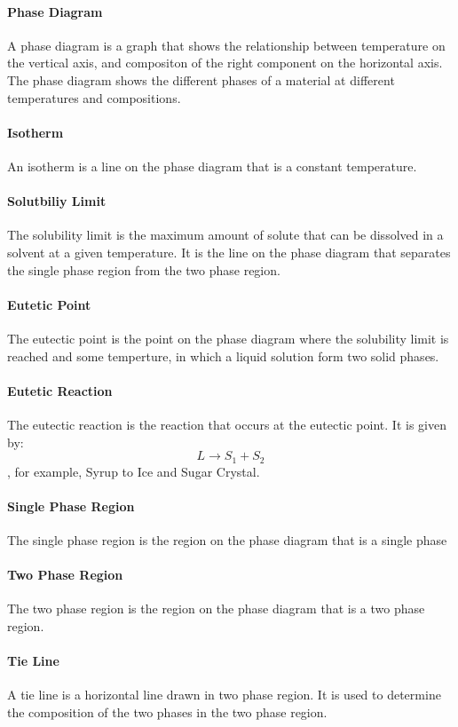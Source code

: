\documentclass[11pt]{article}
\begin{document}
\begin{Gibb's Energy}
\paragraph{Phase Diagram} A phase diagram is a graph that shows the relationship between temperature on the vertical axis, and compositon of the right component on the horizontal axis. The phase diagram shows the different phases of a material at different temperatures and compositions. 
\paragraph{Isotherm} An isotherm is a line on the phase diagram that is a constant temperature. 
\paragraph{Solutbiliy Limit} The solubility limit is the maximum amount of solute that can be dissolved in a solvent at a given temperature. It is the line on the phase diagram that separates the single phase region from the two phase region.
\paragraph{Eutetic Point} The eutectic point is the point on the phase diagram where the solubility limit is reached and some temperture, in which a liquid solution form two solid phases. 
\paragraph{Eutetic Reaction} The eutectic reaction is the reaction that occurs at the eutectic point. It is given by:
\begin{equation}
    L \rightarrow S_1 + S_2
\end{equation}
, for example, Syrup to Ice and Sugar Crystal.
\paragraph{Single Phase Region} The single phase region is the region on the phase diagram that is a single phase
\paragraph{Two Phase Region} The two phase region is the region on the phase diagram that is a two phase region. 
\paragraph{Tie Line} A tie line is a horizontal line drawn in two phase region. It is used to determine the composition of the two phases in the two phase region.

\end{Gibb's Energy}
\end{document}
